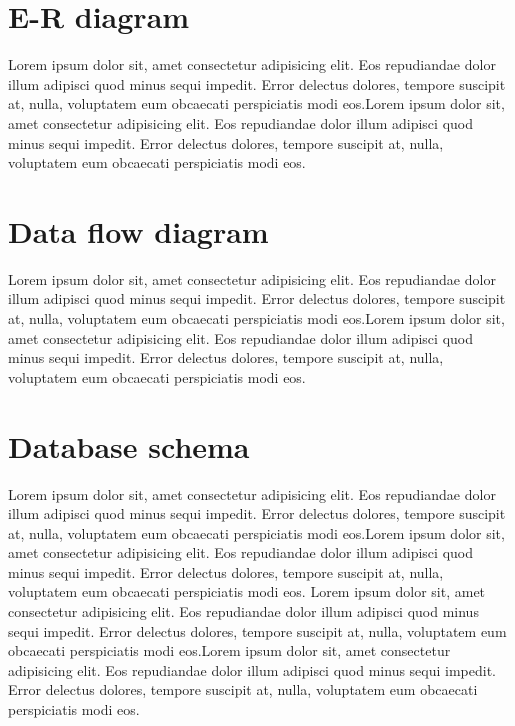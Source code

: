 \section{E-R diagram}
Lorem ipsum dolor sit, amet consectetur adipisicing elit. Eos repudiandae dolor illum adipisci quod minus sequi impedit. Error delectus dolores, tempore suscipit at, nulla, voluptatem eum obcaecati perspiciatis modi eos.Lorem ipsum dolor sit, amet consectetur adipisicing elit. Eos repudiandae dolor illum adipisci quod minus sequi impedit. Error delectus dolores, tempore suscipit at, nulla, voluptatem eum obcaecati perspiciatis modi eos.

\section{Data flow diagram}
Lorem ipsum dolor sit, amet consectetur adipisicing elit. Eos repudiandae dolor illum adipisci quod minus sequi impedit. Error delectus dolores, tempore suscipit at, nulla, voluptatem eum obcaecati perspiciatis modi eos.Lorem ipsum dolor sit, amet consectetur adipisicing elit. Eos repudiandae dolor illum adipisci quod minus sequi impedit. Error delectus dolores, tempore suscipit at, nulla, voluptatem eum obcaecati perspiciatis modi eos.
\section{Database schema}
Lorem ipsum dolor sit, amet consectetur adipisicing elit. Eos repudiandae dolor illum adipisci quod minus sequi impedit. Error delectus dolores, tempore suscipit at, nulla, voluptatem eum obcaecati perspiciatis modi eos.Lorem ipsum dolor sit, amet consectetur adipisicing elit. Eos repudiandae dolor illum adipisci quod minus sequi impedit. Error delectus dolores, tempore suscipit at, nulla, voluptatem eum obcaecati perspiciatis modi eos.
Lorem ipsum dolor sit, amet consectetur adipisicing elit. Eos repudiandae dolor illum adipisci quod minus sequi impedit. Error delectus dolores, tempore suscipit at, nulla, voluptatem eum obcaecati perspiciatis modi eos.Lorem ipsum dolor sit, amet consectetur adipisicing elit. Eos repudiandae dolor illum adipisci quod minus sequi impedit. Error delectus dolores, tempore suscipit at, nulla, voluptatem eum obcaecati perspiciatis modi eos.